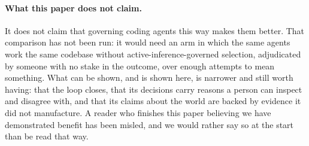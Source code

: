 \paragraph{What this paper does not claim.}  It does not claim that governing
coding agents this way makes them better.  That comparison has not been run: it
would need an arm in which the same agents work the same codebase without
active-inference-governed selection, adjudicated by someone with no stake in the
outcome, over enough attempts to mean something.  What can be shown, and is
shown here, is narrower and still worth having: that the loop closes, that its
decisions carry reasons a person can inspect and disagree with, and that its
claims about the world are backed by evidence it did not manufacture.  A reader
who finishes this paper believing we have demonstrated benefit has been misled,
and we would rather say so at the start than be read that way.
